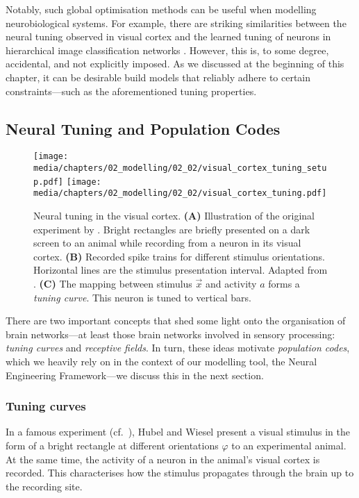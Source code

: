 Notably, such global optimisation methods can be useful when modelling neurobiological systems.
For example, there are striking similarities between the neural tuning observed in visual cortex and the learned tuning of neurons in hierarchical image classification networks \citep{yamins2016using}.
However, this is, to some degree, accidental, and not explicitly imposed.
As we discussed at the beginning of this chapter, it can be desirable build models that reliably adhere to certain constraints---such as the aforementioned tuning properties.

\subsection{Neural Tuning and Population Codes}
\label{sec:neural_tuning}

\begin{figure}
	\centering
	\texttt{[image: media/chapters/02\_modelling/02\_02/visual\_cortex\_tuning\_setup.pdf]}%
	\texttt{[image: media/chapters/02\_modelling/02\_02/visual\_cortex\_tuning.pdf]}
	\caption[Neural tuning in the visual cortex]{Neural tuning in the visual cortex.
	\textbf{(A)} Illustration of the original experiment by \citet{hubel1959receptive}. Bright rectangles are briefly presented on a dark screen to an animal while recording from a neuron in its visual cortex. \textbf{(B)} Recorded spike trains for different stimulus orientations. Horizontal lines are the stimulus presentation interval. Adapted from \citet[Figure~3]{hubel1959receptive}. \textbf{(C)} The mapping between stimulus $\vec x$ and activity $a$ forms a \emph{tuning curve}. This neuron is tuned to vertical bars.}
	\label{fig:visual_cortex_tuning}
\end{figure}

There are two important concepts that shed some light onto the organisation of brain networks---at least those brain networks involved in sensory processing: \emph{tuning curves} and \emph{receptive fields}.
In turn, these ideas motivate \emph{population codes}, which we heavily rely on in the context of our modelling tool, the Neural Engineering Framework---we discuss this in the next section.

\subsubsection{Tuning curves}
In a famous \citeyear{hubel1959receptive} experiment (cf.~), Hubel and Wiesel present a visual stimulus in the form of a bright rectangle at different orientations $\varphi$ to an experimental animal.
At the same time, the activity of a neuron in the animal's visual cortex is recorded.
This characterises how the stimulus propagates through the brain up to the recording site.

